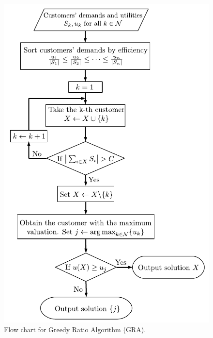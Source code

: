
\begin{figure}[!ht]
\centering\vspace{-5pt} 
 \includegraphics[scale=0.6]{fig/flow-chart-greedy-e.pdf}
\caption{Flow chart for Greedy Ratio Algorithm {\sc (GRA)}.} \vspace{-5pt} 
\label{fig:alge}
\end{figure}

